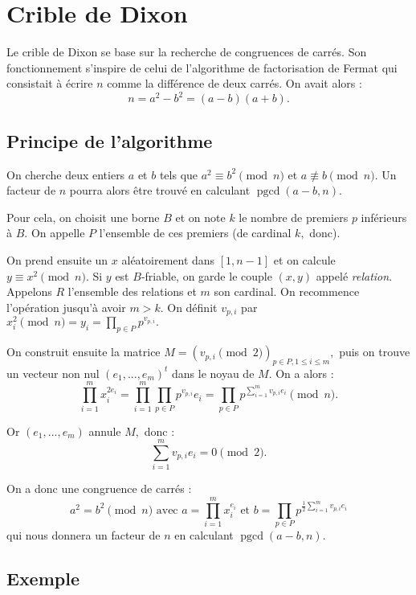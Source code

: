 \documentclass[french, 12pt, titlepage]{article}
\DeclareMathOperator{\pgcd}{pgcd}
\begin{document}
\section{Crible de Dixon}

Le crible de Dixon se base sur la recherche de congruences de
carrés. Son fonctionnement s'inspire de celui de l'algorithme de
factorisation de Fermat qui consistait à écrire $n$ comme la
différence de deux carrés. On avait alors : \[n = a^2 - b^2 = (a - b)(a + b).\]

\subsection{Principe de l'algorithme}

On cherche deux entiers $a$ et $b$ tels que $a^2 \equiv b^2 \pmod n$ et $a \nequiv b \pmod n.$ Un facteur de $n$ pourra alors être trouvé en calculant
$\pgcd(a - b, n).$

Pour cela, on choisit une borne $B$ et on note $k$ le nombre de
premiers $p$ inférieurs à $B.$ On appelle $P$ l'ensemble de ces
premiers (de cardinal $k,$ donc).

On prend ensuite un $x$ aléatoirement dans $[1, n - 1]$ et
on calcule $y \equiv x^2 \pmod n.$ Si $y$ est $B$-friable, on garde le
couple $(x, y)$ appelé \textit{relation}. Appelons $R$ l'ensemble des
relations et $m$ son cardinal. On recommence l'opération jusqu'à
avoir $m > k.$ On définit $v_{p, i}$ par $x_i^2 \pmod n = y_i = \prod\limits_{p \in P} p^{v_{p, i}}.$

On construit ensuite la matrice $M = (v_{p, i} \pmod 2)_{p \in P, 1
  \leq i \leq m},$ puis on trouve un vecteur non nul $(e_1, ..., e_m)^t$
dans le noyau de $M.$
On a alors : \[\prod\limits_{i=1}^m x_i^{2e_i} = \prod\limits_{i=1}^m \prod\limits_{p \in P} p^{v_{p, i}}e_i = \prod\limits_{p \in P} p^{\sum\limits_{i=1}^m v_{p, i}e_i} \pmod n.\]

Or $(e_1, ..., e_m)$ annule $M,$ donc : \[\sum\limits_{i=1}^m v_{p,
  i}e_i = 0 \pmod 2.\]

On a donc une congruence de carrés : \[a^2 = b^2 \pmod n \text{ avec } a = \prod\limits_{i=1}^m x_i^{e_i} \text{ et } b = \prod\limits_{p \in P} p^{\frac{1}{2} \sum\limits_{i=1}^m v_{p, i}e_i}\] qui nous donnera un facteur
de $n$ en calculant $\pgcd(a - b, n).$

\subsection{Exemple}
\end{document}
